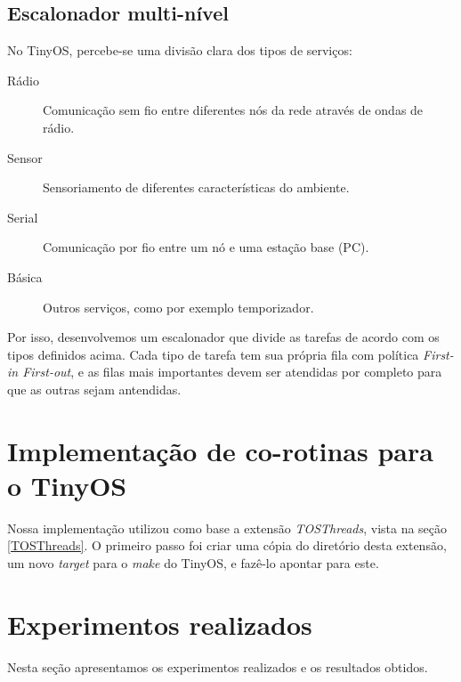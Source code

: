 \documentclass[a4paper, 10pt]{article}
\begin{document}
\subsection{Escalonador multi-nível}
No TinyOS, percebe-se uma divisão clara dos tipos de serviços: 
\begin{description}
    \item[Rádio] Comunicação sem fio entre diferentes nós da rede através de ondas de rádio.
    \item[Sensor] Sensoriamento de diferentes características do ambiente.
    \item[Serial] Comunicação por fio entre um nó e uma estação base (PC).
    \item[Básica] Outros serviços, como por exemplo temporizador.
\end{description}
Por isso, desenvolvemos um escalonador que divide as tarefas de acordo com os tipos definidos acima.
Cada tipo de tarefa tem sua própria fila com política \textit{First-in First-out}, e as filas mais importantes devem ser
atendidas por completo para que as outras sejam antendidas.


\section{Implementação de co-rotinas para o TinyOS}
Nossa implementação utilizou como base a extensão \textit{TOSThreads}, vista na seção \ref{TOSThreads}. O primeiro passo
foi criar uma cópia do diretório desta extensão, um novo \textit{target} para o \textit{make} do TinyOS, e fazê-lo apontar
para este. 

\section{Experimentos realizados}\label{resultados}
Nesta seção apresentamos os experimentos realizados e os resultados obtidos.

\end{document}
